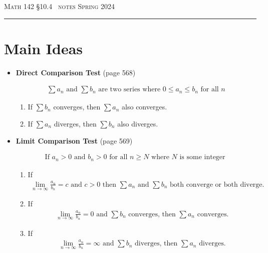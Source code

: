 \documentclass{article}
\def\chapt{10.4}
\begin{document}
\noindent
{\scshape Math 142} \hfill {\scshape \S\chapt~ notes} \hfill {\scshape Spring 2024}

\smallskip

\hrule

\bigskip

\section*{Main Ideas}

\begin{itemize}

% 
%
%
%
\item
\textbf{Direct Comparison Test} (page 568)

\begin{gather*}
\sum a_n
\text{ and }
\sum b_n
\text{ are two series where }
0 \leq a_n \leq b_n
\text{ for all }
n
\end{gather*}

\begin{enumerate}
\item
If $\sum b_n$ converges, then $\sum a_n$ also converges.
\item
If $\sum a_n$ diverges, then $\sum b_n$ also diverges.
\end{enumerate}
\hfill
%
%
%
%
\item
\textbf{Limit Comparison Test} (page 569)

\begin{gather*}
\text{If }
a_n > 0
\text{ and }
b_n > 0
\text{ for all }
n \geq N
\text{ where $N$ is some integer }
\end{gather*}

\begin{enumerate}
\item
If
\begin{gather*}
\lim_{n\to\infty} \frac{a_n}{b_n}=c \text{ and } c>0
\text{ then }
\sum a_n
\text{ and }
\sum b_n
\text{ both converge or both diverge.}
\end{gather*}
\item

If
\begin{gather*}
\lim_{n\to\infty} \frac{a_n}{b_n}=0
\text{ and }
\sum b_n
\text{ converges, then }
\sum a_n
\text{ converges.}
\end{gather*}
\item

If
\begin{gather*}
\lim_{n\to\infty} \frac{a_n}{b_n}=\infty
\text{ and }
\sum b_n
\text{ diverges, then }
\sum a_n
\text{ diverges.}
\end{gather*}
\end{enumerate}

\end{itemize}
\end{document}
